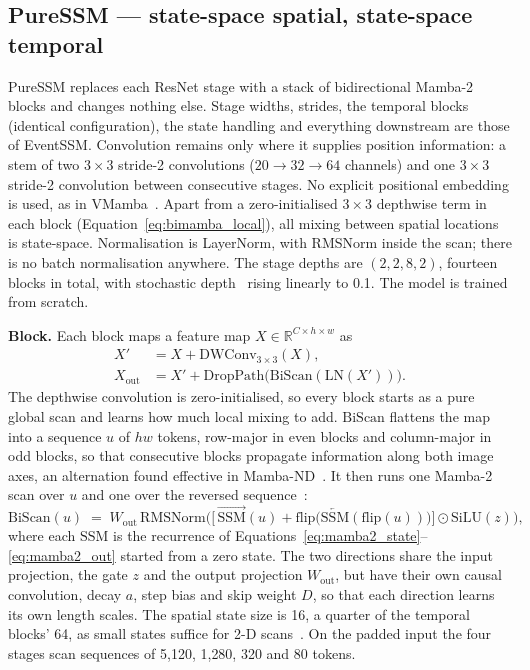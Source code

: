 \documentclass[11pt, a4paper]{report}
\begin{document}
\subsection{PureSSM --- state-space spatial, state-space temporal}
\label{subsec:puressm}
PureSSM replaces each ResNet stage with a stack of bidirectional Mamba-2 blocks and changes nothing else.
Stage widths, strides, the temporal blocks (identical configuration), the state handling and everything
downstream are those of EventSSM. Convolution remains only where it supplies position information: a stem
of two $3\times3$ stride-2 convolutions ($20\to32\to64$ channels) and one $3\times3$ stride-2 convolution
between consecutive stages. No explicit positional embedding is used, as in VMamba~\cite{liu2024vmamba}.
Apart from a zero-initialised $3\times3$ depthwise term in each block (Equation~\eqref{eq:bimamba_local}),
all mixing between spatial locations is state-space. Normalisation is LayerNorm, with RMSNorm inside the scan; there is
no batch normalisation anywhere. The stage depths are $(2,2,8,2)$, fourteen blocks in total, with
stochastic depth~\cite{huang2016deep} rising linearly to 0.1. The model is trained from scratch.

\textbf{Block.} Each block maps a feature map $X\in\mathbb{R}^{C\times h\times w}$ as
\begin{align}
  X' &= X + \mathrm{DWConv}_{3\times3}(X), \label{eq:bimamba_local}\\
  X_{\mathrm{out}} &= X' + \mathrm{DropPath}\big(\mathrm{BiScan}(\mathrm{LN}(X'))\big). \label{eq:bimamba_block}
\end{align}
The depthwise convolution is zero-initialised, so every block starts as a pure global scan and learns how
much local mixing to add. $\mathrm{BiScan}$ flattens the map into a sequence $u$ of $hw$ tokens, row-major
in even blocks and column-major in odd blocks, so that consecutive blocks propagate information along both
image axes, an alternation found effective in Mamba-ND~\cite{li2024mamband}. It then runs one Mamba-2 scan
over $u$ and one over the reversed sequence~\cite{zhu2024vision}:
\begin{equation}
  \mathrm{BiScan}(u) \;=\; W_{\mathrm{out}}\,\mathrm{RMSNorm}\Big(\big[\,\overrightarrow{\mathrm{SSM}}(u)
  + \mathrm{flip}\big(\overleftarrow{\mathrm{SSM}}(\mathrm{flip}(u))\big)\big]\odot\mathrm{SiLU}(z)\Big),
  \label{eq:biscan}
\end{equation}
where each $\mathrm{SSM}$ is the recurrence of Equations~\eqref{eq:mamba2_state}--\eqref{eq:mamba2_out}
started from a zero state. The two directions share the input projection, the gate $z$ and the output
projection $W_{\mathrm{out}}$, but have their own causal convolution, decay $a$, step bias and skip weight
$D$, so that each direction learns its own length scales. The spatial state size is 16, a quarter of the
temporal blocks' 64, as small states suffice for 2-D scans~\cite{liu2024vmamba}. On the padded input the
four stages scan sequences of 5{,}120, 1{,}280, 320 and 80 tokens.
\end{document}
